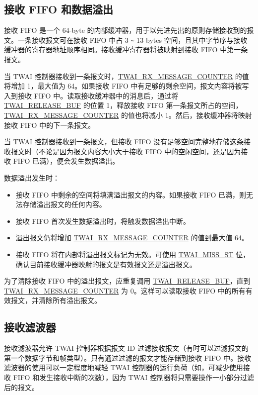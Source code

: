 \documentclass[main\_\_CN.tex]{subfiles}
\begin{document}
\subsection{接收 FIFO 和数据溢出}

接收 FIFO 是一个 64-byte 的内部缓冲器，用于以先进先出的原则存储接收到的报文。一条接收报文可在接收 FIFO 中占 3 \verb+~+ 13 bytes 空间，且其中字节序与接收缓冲器的寄存器地址顺序相同。接收缓冲寄存器将被映射到接收 FIFO 中第一条报文。

当 TWAI 控制器接收到一条报文时，\hyperref[fielddesc:TWAIRXMESSAGECOUNTER]{TWAI\_RX\_MESSAGE\_COUNTER} 的值将增加 1，最大值为 64。如果接收 FIFO 中有足够的剩余空间，报文内容将被写入到接收 FIFO 中。读取接收缓冲器中的消息后，通过将 \hyperref[fielddesc:TWAIRELEASEBUF]{TWAI\_RELEASE\_BUF} 的位置 1，释放接收 FIFO 第一条报文所占的空间，\hyperref[fielddesc:TWAIRXMESSAGECOUNTER]{TWAI\_RX\_MESSAGE\_COUNTER} 的值也将减小 1。然后，接收缓冲器将映射接收 FIFO 中的下一条报文。

当 TWAI 控制器接收到一条报文，但接收 FIFO 没有足够空间完整地存储这条接收报文时（不论是因为报文内容大小大于接收 FIFO 中的空闲空间，还是因为接收 FIFO 已满），便会发生数据溢出。

数据溢出发生时：
\begin{itemize}
    \item 接收 FIFO 中剩余的空间将填满溢出报文的内容。如果接收 FIFO 已满，则无法存储溢出报文的任何内容。
    \item 接收 FIFO 首次发生数据溢出时，将触发数据溢出中断。
    \item 溢出报文仍将增加 \hyperref[fielddesc:TWAIRXMESSAGECOUNTER]{TWAI\_RX\_MESSAGE\_COUNTER} 的值到最大值 64。
    \item 接收 FIFO 将在内部将溢出报文标记为无效。可使用 \hyperref[fielddesc:TWAIMISSST]{TWAI\_MISS\_ST} 位，确认目前接收缓冲器映射的报文是有效报文还是溢出报文。
\end{itemize}

为了清除接收 FIFO 中的溢出报文，应重复调用 \hyperref[fielddesc:TWAIRELEASEBUF]{TWAI\_RELEASE\_BUF}，直到 \hyperref[fielddesc:TWAIRXMESSAGECOUNTER]{TWAI\_RX\_MESSAGE\_COUNTER} 为 0。这样可以读取接收 FIFO 中的所有有效报文，并清除所有溢出报文。

\subsection{接收滤波器}

接收滤波器允许 TWAI 控制器根据报文 ID 过滤接收报文（有时可以过滤报文的第一个数据字节和帧类型）。只有通过过滤的报文才能存储到接收 FIFO 中。接收滤波器的使用可以一定程度地减轻 TWAI 控制器的运行负荷（如，可减少使用接收 FIFO 和发生接收中断的次数），因为 TWAI 控制器将只需要操作一小部分过滤后的报文。
\end{document}
